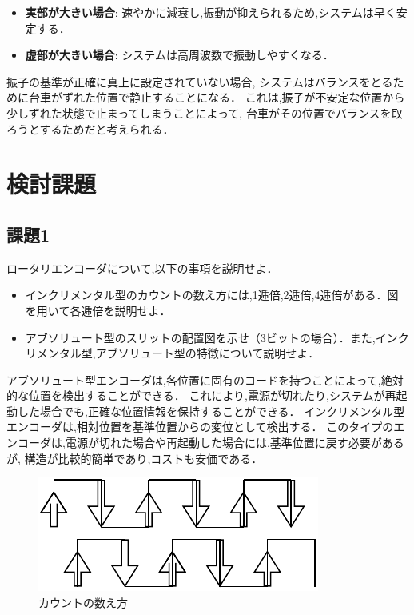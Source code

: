 \begin{itemize}
  \item \textbf{実部が大きい場合}: 速やかに減衰し,振動が抑えられるため,システムは早く安定する．
  \item \textbf{虚部が大きい場合}: システムは高周波数で振動しやすくなる．
\end{itemize}

振子の基準が正確に真上に設定されていない場合,
システムはバランスをとるために台車がずれた位置で静止することになる．
これは,振子が不安定な位置から少しずれた状態で止まってしまうことによって,
台車がその位置でバランスを取ろうとするためだと考えられる．

\section{検討課題}

\subsection*{課題1}
ロータリエンコーダについて,以下の事項を説明せよ．
\begin{itemize}
  \item インクリメンタル型のカウントの数え方には,1逓倍,2逓倍,4逓倍がある．図を用いて各逓倍を説明せよ．
  \item アブソリュート型のスリットの配置図を示せ（3ビットの場合）．また,インクリメンタル型,アブソリュート型の特徴について説明せよ．
\end{itemize}

アブソリュート型エンコーダは,各位置に固有のコードを持つことによって,絶対的な位置を検出することができる．
これにより,電源が切れたり,システムが再起動した場合でも,正確な位置情報を保持することができる．
インクリメンタル型エンコーダは,相対位置を基準位置からの変位として検出する．
このタイプのエンコーダは,電源が切れた場合や再起動した場合には,基準位置に戻す必要があるが,
構造が比較的簡単であり,コストも安価である．

\begin{figure}[h]
  \centering
  \includegraphics[scale=0.8]{sozai/11.pdf}
  \caption{カウントの数え方}
\end{figure}

